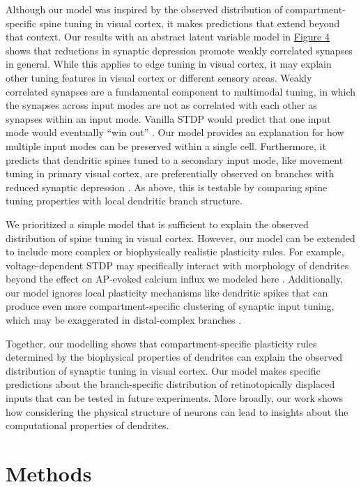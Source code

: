 Although our model was inspired by the observed distribution of compartment-specific spine tuning in visual cortex, it makes predictions that extend beyond that context. Our results with an abstract latent variable model in \hyperref[fig:4]{Figure 4} shows that reductions in synaptic depression promote weakly correlated synapses in general. While this applies to edge tuning in visual cortex, it may explain other tuning features in visual cortex or different sensory areas. Weakly correlated synapses are a fundamental component to multimodal tuning, in which the synapses across input modes are not as correlated with each other as synapses within an input mode. Vanilla STDP would predict that one input mode would eventually “win out”  \citep{songCompetitiveHebbianLearning2000}. Our model provides an explanation for how multiple input modes can be preserved within a single cell. Furthermore, it predicts that dendritic spines tuned to a secondary input mode, like movement tuning in primary visual cortex, are preferentially observed on branches with reduced synaptic depression \citep{xuNonlinearDendriticIntegration2012,bugeonTranscriptomicAxisPredicts2022}. As above, this is testable by comparing spine tuning properties with local dendritic branch structure.

We prioritized a simple model that is sufficient to explain the observed distribution of spine tuning in visual cortex. However, our model can be extended to include more complex or biophysically realistic plasticity rules. For example, voltage-dependent STDP may specifically interact with morphology of dendrites beyond the effect on AP-evoked calcium influx we modeled here \citep{clopathConnectivityReflectsCoding2010}. Additionally, our model ignores local plasticity mechanisms like dendritic spikes that can produce even more compartment-specific clustering of synaptic input tuning, which may be exaggerated in distal-complex branches \citep{bonoModelingSomaticDendritic2017}.

Together, our modelling shows that compartment-specific plasticity rules determined by the biophysical properties of dendrites can explain the observed distribution of synaptic tuning in visual cortex. Our model makes specific predictions about the branch-specific distribution of retinotopically displaced inputs that can be tested in future experiments. More broadly, our work shows how considering the physical structure of neurons can lead to insights about the computational properties of dendrites. 

\section*{Methods}\label{s:methods}

